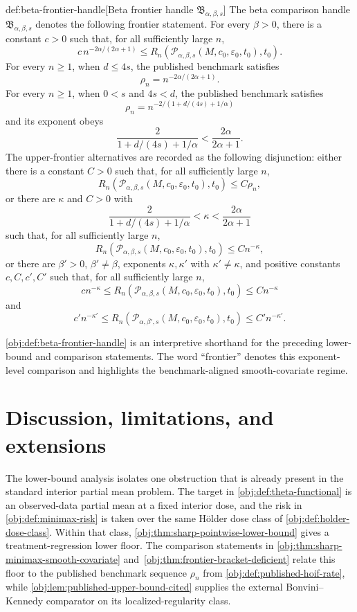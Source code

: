 \documentclass[11pt]{article}
\begin{document}
\begin{remarkv}{def:beta-frontier-handle}[Beta frontier handle $\mathfrak B_{\alpha,\beta,s}$]
The beta comparison handle \(\mathfrak B_{\alpha,\beta,s}\) denotes the following frontier statement. For every \(\beta>0\), there is a constant \(c>0\) such that, for all sufficiently large \(n\),
\[
c\,n^{-2\alpha/(2\alpha+1)}
\le
R_n\!\left(\mathcal P_{\alpha,\beta,s}(M,c_0,\varepsilon_0,t_0),t_0\right).
\]
For every \(n\ge 1\), when \(d\le 4s\), the published benchmark satisfies
\[
\rho_n
=
n^{-2\alpha/(2\alpha+1)}.
\]
For every \(n\ge 1\), when \(0<s\) and \(4s<d\), the published benchmark satisfies
\[
\rho_n
=
n^{-2/(1+d/(4s)+1/\alpha)}
\]
and its exponent obeys
\[
\frac{2}{1+d/(4s)+1/\alpha}
<
\frac{2\alpha}{2\alpha+1}.
\]
The upper-frontier alternatives are recorded as the following disjunction: either there is a constant \(C>0\) such that, for all sufficiently large \(n\),
\[
R_n\!\left(\mathcal P_{\alpha,\beta,s}(M,c_0,\varepsilon_0,t_0),t_0\right)
\le
C\rho_n,
\]
or there are \(\kappa\) and \(C>0\) with
\[
\frac{2}{1+d/(4s)+1/\alpha}<\kappa<\frac{2\alpha}{2\alpha+1}
\]
such that, for all sufficiently large \(n\),
\[
R_n\!\left(\mathcal P_{\alpha,\beta,s}(M,c_0,\varepsilon_0,t_0),t_0\right)
\le
C n^{-\kappa},
\]
or there are \(\beta'>0\), \(\beta'\ne\beta\), exponents \(\kappa,\kappa'\) with \(\kappa'\ne\kappa\), and positive constants \(c,C,c',C'\) such that, for all sufficiently large \(n\),
\[
c n^{-\kappa}
\le
R_n\!\left(\mathcal P_{\alpha,\beta,s}(M,c_0,\varepsilon_0,t_0),t_0\right)
\le
C n^{-\kappa}
\]
and
\[
c' n^{-\kappa'}
\le
R_n\!\left(\mathcal P_{\alpha,\beta',s}(M,c_0,\varepsilon_0,t_0),t_0\right)
\le
C' n^{-\kappa'}.
\]
\end{remarkv}

\cref{obj:def:beta-frontier-handle} is an interpretive shorthand for the preceding lower-bound and comparison statements. The word ``frontier'' denotes this exponent-level comparison and highlights the benchmark-aligned smooth-covariate regime.


\section{Discussion, limitations, and extensions}

The lower-bound analysis isolates one obstruction that is already present in the standard interior partial mean problem. The target in \cref{obj:def:theta-functional} is an observed-data partial mean at a fixed interior dose, and the risk in \cref{obj:def:minimax-risk} is taken over the same Hölder dose class of \cref{obj:def:holder-dose-class}. Within that class, \cref{obj:thm:sharp-pointwise-lower-bound} gives a treatment-regression lower floor. The comparison statements in \cref{obj:thm:sharp-minimax-smooth-covariate} and~\cref{obj:thm:frontier-bracket-deficient} relate this floor to the published benchmark sequence \(\rho_n\) from \cref{obj:def:published-hoif-rate}, while \cref{obj:lem:published-upper-bound-cited} supplies the external Bonvini--Kennedy comparator on its localized-regularity class.
\end{document}
